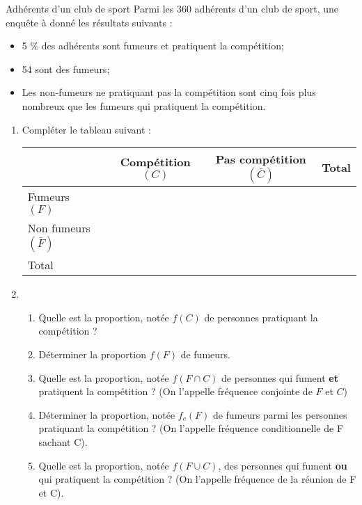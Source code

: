 \begin{myact}{Adhérents d'un club de sport}
	Parmi les 360 adhérents d'un club de sport, une enquête à donné les résultats suivants :
	\begin{itemize}
		\item 5 \% des adhérents sont fumeurs et pratiquent la compétition;
		\item 54 sont des fumeurs;
		\item Les non-fumeurs ne pratiquant pas la compétition sont cinq fois plus nombreux que les fumeurs qui pratiquent la compétition.		
	\end{itemize}

	\begin{enumerate}
		\item Compléter le tableau suivant :
		
		\begin{tabular}{|@{\ }l@{\ }|@{\ }c@{\ }|@{\ }c@{\ }|@{$\quad$}c@{$\quad$}|}
			\hline
			& Compétition $(C)$ & Pas compétition $(\bar{C})$ & Total \\ \hline
			Fumeurs  $(F)$   &             &                 &       \\ \hline
			Non fumeurs $(\bar{F})$ &             &                 &       \\ \hline
			Total       &             &                 &       \\ \hline
		\end{tabular}
	
		\item \begin{enumerate}[label=\alph*)]
			\item Quelle est la proportion, notée $f(C)$ de personnes pratiquant la compétition ?
			\item Déterminer la proportion $f(F)$ de fumeurs.
			\item Quelle est la proportion, notée $f(F \cap C)$ de personnes qui fument \textbf{et} pratiquent la compétition ? (On l'appelle fréquence conjointe de $F$ et $C$)
			\item Déterminer la proportion, notée $f_c(F)$ de fumeurs parmi les personnes pratiquant la compétition ? (On l'appelle fréquence conditionnelle de F sachant C).
			\item Quelle est la proportion, notée $f(F\cup C)$, des personnes qui fument \textbf{ou} qui pratiquent la compétition ? (On l'appelle fréquence de la réunion de F et C).			
		\end{enumerate}
	
	\end{enumerate}
\end{myact}